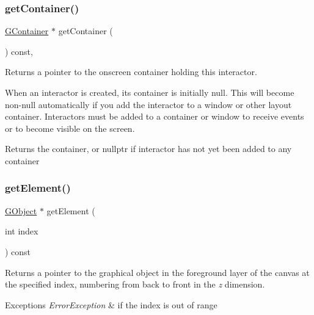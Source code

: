 \subsubsection{\texorpdfstring{get\+Container()}{getContainer()}}
{\footnotesize\ttfamily \mbox{\hyperlink{classsgl_1_1GContainer}{G\+Container}} $\ast$ get\+Container (\begin{DoxyParamCaption}{ }\end{DoxyParamCaption}) const\hspace{0.3cm}{\ttfamily [virtual]}, {\ttfamily [inherited]}}



Returns a pointer to the onscreen container holding this interactor. 

When an interactor is created, its container is initially null. This will become non-\/null automatically if you add the interactor to a window or other layout container. Interactors must be added to a container or window to receive events or to become visible on the screen. \begin{DoxyReturn}{Returns}
the container, or nullptr if interactor has not yet been added to any container 
\end{DoxyReturn}
\mbox{\label{classsgl_1_1GCanvas_abde388cc529d22bb5f7f4a54d56049d8}} 
\subsubsection{\texorpdfstring{get\+Element()}{getElement()}}
{\footnotesize\ttfamily \mbox{\hyperlink{classsgl_1_1GObject}{G\+Object}} $\ast$ get\+Element (\begin{DoxyParamCaption}\item[{int}]{index }\end{DoxyParamCaption}) const\hspace{0.3cm}{\ttfamily [virtual]}}



Returns a pointer to the graphical object in the foreground layer of the canvas at the specified index, numbering from back to front in the {\itshape z} dimension. 


\begin{DoxyExceptions}{Exceptions}
{\em Error\+Exception} & if the index is out of range \\
\hline
\end{DoxyExceptions}
\mbox{\label{classsgl_1_1GCanvas_a25efa999eca5790ec26ef091b05f961c}} 
